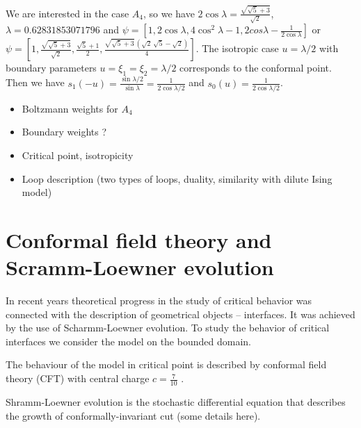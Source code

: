 \documentclass[12pt]{article}
\begin{document}





  We are interested in the case $A_4$, so we have
$2\cos\lambda=\frac{\sqrt{\sqrt{5}+3}}{\sqrt{2}}$,
$\lambda=0.62831853071796$ and $\psi=\left[1,2\cos\lambda,
  4\cos^2\lambda-1, 2cos\lambda-\frac{1}{2\cos\lambda}\right]$ or $\psi=\left[1,\frac{\sqrt{\sqrt{5}+3}}{\sqrt{2}},\frac{\sqrt{5}+1}{2},\frac{\sqrt{\sqrt{5}+3}\,\left( \sqrt{2}\,\sqrt{5}-\sqrt{2}\right) }{4}\right]$.
The isotropic case $u=\lambda/2$ with boundary parameters
$u=\xi_1=\xi_2=\lambda/2$ corresponds to the  conformal point. Then we have
$s_1(-u)=\frac{\sin\lambda/2}{\sin\lambda}=\frac{1}{2\cos\lambda/2}$ and $s_0(u)=\frac{1}{2\cos\lambda/2}$.

\begin{itemize}
\item Boltzmann weights for $A_{4}$
\item Boundary weights ?
\item Critical point, isotropicity
\item Loop description (two types of loops, duality, similarity with dilute Ising model) 
\end{itemize}

\section{Conformal field theory and Scramm-Loewner evolution}
\label{sec:conf-field-theory}



In recent
years theoretical progress in the study of critical behavior was connected with the description of
geometrical objects -- interfaces. It was achieved by the use of Scharmm-Loewner evolution. To study
the behavior of critical interfaces we consider the model on the bounded domain. 

The behaviour of the model in critical
point is described by conformal field theory (CFT) with central charge $c=\frac{7}{10}$
\cite{friedan1985superconformal}. 

Shramm-Loewner evolution is the stochastic differential equation that describes the growth of
conformally-invariant cut (some details here).
\end{document}
